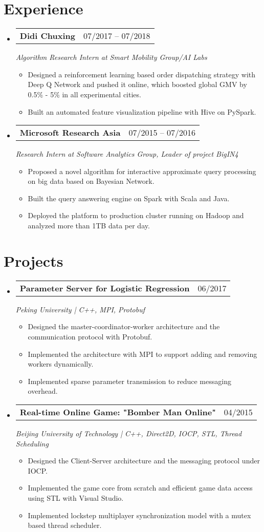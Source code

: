 \documentclass[a4paper,11pt]{article}
\makeatletter
\newcommand{\resumeItem}[1]{
  \item\small{#1 \vspace{-2pt}}
}
\newcommand{\resumeSubheading}[3]{
  \vspace{-1pt}\item
    \begin{tabular*}{0.97\textwidth}{l@{\extracolsep{\fill}}r}
      \textbf{#1} & #2
      \end{tabular*}
      \textit{\small#3}
}
\newcommand{\resumeItemListStart}{\begin{itemize}[leftmargin=*, topsep=0ex]}
\newcommand{\resumeItemListEnd}{\end{itemize}}
\makeatother
\begin{document}
\section{Experience}
  \begin{itemize}[leftmargin=*, itemsep=5pt, label={}]

    \resumeSubheading
      {Didi Chuxing}{07/2017 -- 07/2018}
      {Algorithm Research Intern at Smart Mobility Group/AI Labs}
      \resumeItemListStart
        \resumeItem
        {Designed a reinforcement learning based order dispatching strategy with Deep Q Network and pushed it online, which boosted global GMV by 0.5\% - 5\% in all experimental cities.}
        \resumeItem
        {Built an automated feature visualization pipeline with Hive on PySpark.}
    \resumeItemListEnd
      
    \resumeSubheading
      {Microsoft Research Asia}{07/2015 -- 07/2016}
      {Research Intern at Software Analytics Group, Leader of project BigIN4}
      \resumeItemListStart
        \resumeItem
        {Proposed a novel algorithm for interactive approximate query processing on big data based on Bayesian Network.}
        \resumeItem
        {Built the query answering engine on Spark with Scala and Java.}
        \resumeItem
        {Deployed the platform to production cluster running on Hadoop and analyzed more than 1TB data per day.}
      \resumeItemListEnd
  \end{itemize}
  
\section{Projects}
  \begin{itemize}[leftmargin=*, itemsep=5pt, label={}]
    
    \resumeSubheading{Parameter Server for Logistic Regression}{06/2017}
    {Peking University | C++, MPI, Protobuf}
        \resumeItemListStart
            \resumeItem {Designed the master-coordinator-worker architecture and the communication protocol with Protobuf.}
            \resumeItem {Implemented the architecture with MPI to support adding and removing workers dynamically.}
            \resumeItem {Implemented sparse parameter transmission to reduce messaging overhead.}
        \resumeItemListEnd
        
    \resumeSubheading{Real-time Online Game: "Bomber Man Online"}{04/2015}{Beijing University of Technology | C++, Direct2D, IOCP, STL, Thread Scheduling}
        \resumeItemListStart
            \resumeItem {Designed the Client-Server architecture and the messaging protocol under IOCP.}
            \resumeItem {Implemented the game core from scratch and efficient game data access using STL with Visual Studio.}
            \resumeItem {Implemented lockstep multiplayer synchronization model with a mutex based thread scheduler.}
        \resumeItemListEnd
        
  \end{itemize}
\end{document}

